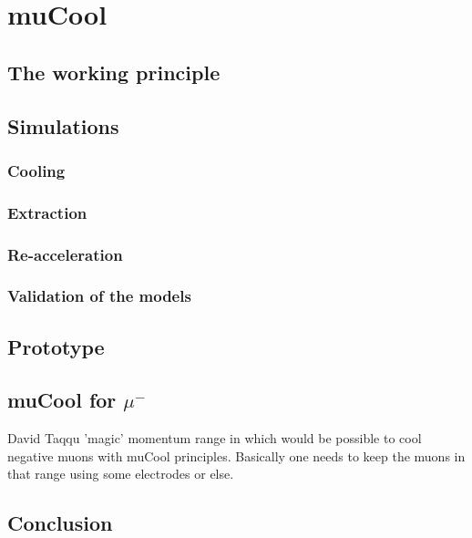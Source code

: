 \chapter{muCool}
\begin{refsection}

\section{The working principle}
\section{Simulations}
\subsection{Cooling}
\subsection{Extraction}
\subsection{Re-acceleration}
\subsection{Validation of the models}
\section{Prototype}
\section{muCool for $\mu^-$}
David Taqqu 'magic' momentum range in which would be possible to cool negative muons with muCool principles. Basically one needs to keep the muons in that range using some electrodes or else.
\section{Conclusion}




\cite{muCool:Taqqu:2006} \cite{muCool:Bao:2014} \cite{muCool:Andreas:2015} \cite{muCool:2018} \cite{muCool:2019} \cite{muCool:Angela:2019} \cite{muCool:2020}

\printbibliography[title=Bibliography on muCool]
\end{refsection}